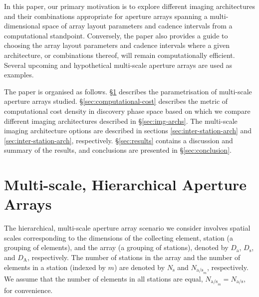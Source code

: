 \documentclass[
  journal=pasa,
  manuscript=article-type,
  year=2020,
  volume=37,
]{cup-journal}
\begin{document}
In this paper, our primary motivation is to explore different imaging architectures and their combinations appropriate for aperture arrays spanning a multi-dimensional space of array layout parameters and cadence intervals from a computational standpoint. Conversely, the paper also provides a guide to choosing the array layout parameters and cadence intervals where a given architecture, or combinations thereof, will remain computationally efficient. Several upcoming and hypothetical multi-scale aperture arrays are used as examples. 

The paper is organised as follows.
\S\ref{sec:multi-scale-arrays} describes the parametrisation of multi-scale aperture arrays studied. \S\ref{sec:computational-cost} describes the metric of computational cost density in discovery phase space based on which we compare different imaging architectures described in \S\ref{sec:img-archs}. The multi-scale imaging architecture options are described in sections \ref{sec:inter-station-arch} and \ref{sec:inter-station-arch}, respectively. \S\ref{sec:results} contains a discussion and summary of the results, and conclusions are presented in \S\ref{sec:conclusion}. 




\section{Multi-scale, Hierarchical Aperture Arrays} \label{sec:multi-scale-arrays}

The hierarchical, multi-scale aperture array scenario we consider involves spatial scales corresponding to the dimensions of the collecting element, station (a grouping of elements), and the array (a grouping of stations), denoted by $D_\textrm{a}$, $D_\textrm{s}$, and $D_\textrm{A}$, respectively. The number of stations in the array and the number of elements in a station (indexed by $m$) are denoted by $N_\textrm{s}$ and $N_{\textrm{a/s}_m}$, respectively. We assume that the number of elements in all stations are equal, $N_{\textrm{a/s}_m} = N_\textrm{a/s}$, for convenience. 
\end{document}
